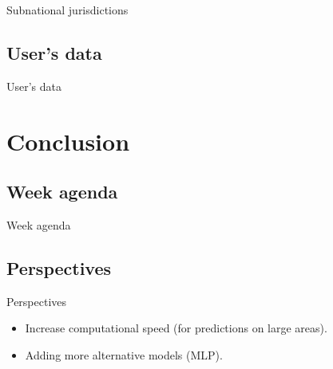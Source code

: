 \documentclass[10pt,table,dvipsnames,compress]{beamer}
\begin{document}
\begin{frame}[label={sec:org29bc259}]{Subnational jurisdictions}
\end{frame}

\subsection{User's data}
\label{sec:org1d9f05d}

\begin{frame}[label={sec:org126a04c}]{User's data}
\end{frame}

\section{Conclusion}
\label{sec:org4aef317}

\subsection{Week agenda}
\label{sec:orgec453e1}

\begin{frame}[label={sec:org2baf735}]{Week agenda}
\end{frame}

\subsection{Perspectives}
\label{sec:org69dbd4f}

\begin{frame}[label={sec:org122d457}]{Perspectives}
\begin{itemize}
\item Increase computational speed (for predictions on large areas).
\item Adding more alternative models (MLP).
\end{itemize}
\end{frame}

\end{document}
